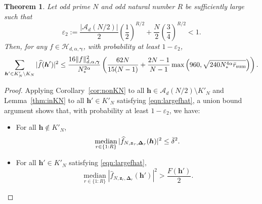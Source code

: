 \documentclass[a4paper,11pt]{article}
\newtheorem{theorem}{Theorem}[section]
\newcommand{\bsh}{\boldsymbol{h}}
\newcommand{\bsz}{\boldsymbol{z}}
\newcommand{\bsgamma}{\boldsymbol{\gamma}}
\newcommand{\bsDelta}{\boldsymbol{\Delta}}
\newcommand{\Hcal}{\mathcal{H}}
\begin{document}
\begin{theorem}\label{thm:K'minusK}
    Let odd prime $N$ and odd natural number $R$ be sufficiently large such that
    \begin{equation}\label{eq:choose_R_second}
    \varepsilon_2:=\frac{|\mathcal{A}_d(N/2)|}{2}\left(\frac{1}{2}\right)^{R/2}+\frac{N}{2}\left(\frac{3}{4}\right)^{R/2 }< 1.
    \end{equation}
    Then, for any $f\in \Hcal_{d,\alpha,\bsgamma}$, with probability at least $1-\varepsilon_2$,
    \[ 
    \sum_{\bsh'\in K'_N\setminus K_N}|\widehat{f}(\bsh')|^2\leq \frac{16\|f\|^2_{d,\alpha,\bsgamma}}{N_*^{2\alpha}}  \left(\frac{62N}{15(N-1)}+\frac{2N-1}{N-1 }\max\left(960,\sqrt{240 N^{4\alpha}_*\Bar{r}_{\mathrm{sum}}}\right) \right).
    \]
\end{theorem}
\begin{proof}
Applying Corollary~\ref{cor:nonKN} to all $\bsh\in \mathcal{A}_d(N/2)\setminus K'_N$ and Lemma~\ref{thm:inKN} to all $\bsh'\in K'_N$ satisfying \eqref{eqn:largefhat}, a union bound argument shows that, with probability at least $1-\varepsilon_2$, we have:
    \begin{itemize}
        \item For all $\bsh\notin K'_N$,
        \[
            \operatorname*{median}_{r\in\{1{:}R\}}| \widehat{f}_{N,\bsz_r,\bsDelta_r}(\bsh)|^2\leq \Bar{\delta}^2.
        \]
        \item For all $\bsh'\in K'_N$ satisfying \eqref{eqn:largefhat},
        \[ 
            \operatorname*{median}_{r\in\{1{:}R\}}| \widehat{f}_{N,\bsz_r,\bsDelta_r}(\bsh')|^2> \frac{F(\bsh')}{2}.
        \]
    \end{itemize}


\end{proof}
\end{document}
